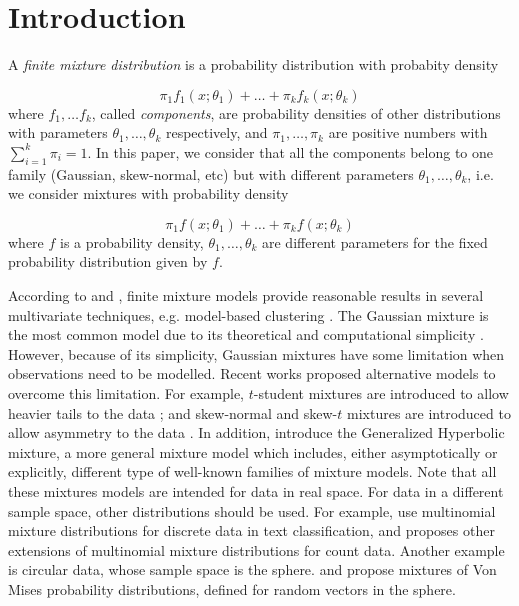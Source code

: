 \documentclass[preprint, review, 3p, authoryear]{elsarticle}
\begin{document}
\section{Introduction}

\noindent  A \emph{finite mixture distribution} is a probability distribution with probabity density

\[
\pi_1 f_1(x ; \theta_1) + \dots + \pi_k f_k(x ; \theta_k)
\]
where $f_1, \dots f_k$, called \emph{components}, are probability densities of other distributions with parameters $\theta_1, \dots, \theta_k$ respectively, and $\pi_1, \dots, \pi_k$ are positive numbers with $\sum_{i=1}^k \pi_i = 1$. In this paper, we consider that all the components belong to one family (Gaussian, skew-normal, etc) but with different parameters $\theta_1, \dots, \theta_k$, i.e. we consider mixtures with probability density

\begin{equation}\label{mixt}
\pi_1 f(x ; \theta_1) + \dots + \pi_k f(x ; \theta_k)
\end{equation}
where $f$ is a probability density, $\theta_1, \dots, \theta_k$ are different parameters for the fixed probability distribution given by $f$.



According to \cite{scott1971clustering} and \cite{mclachlan2004finite}, finite mixture models provide reasonable results in several multivariate techniques, e.g. model-based clustering  \citep{banfield1993model,  fraley2002model}. The Gaussian mixture is the most common model 
due to its theoretical and computational simplicity \citep{mclachlan2004finite}. 
However, because of its simplicity, Gaussian mixtures have some limitation when observations need to be modelled.
%
%
%
Recent works  proposed alternative models to overcome this limitation. For example, $t$-student mixtures are introduced to allow heavier tails to the data \citep{andrews2012model, lee2013finite, lin2010robust}; and skew-normal and skew-$t$ mixtures are introduced to allow asymmetry to the data \citep{lee2011fitting}. In addition, \cite{browne2013mixture} introduce the Generalized Hyperbolic mixture, a more general mixture model which includes, either asymptotically or explicitly, different type of well-known families of mixture models. Note that all these mixtures models are intended for data in real space. For data in a different sample space, other distributions should be used. 
For example, \cite{bickel2004multi} use multinomial mixture distributions for discrete data in text classification, and  
 \cite[][]{bouguila2011count} proposes other extensions of multinomial mixture distributions for count data. 
Another example is circular data, whose sample space is the sphere.  \cite{banerjee2005clustering} and \cite{mardia2007protein} propose mixtures of Von Mises probability distributions, defined for random vectors in the sphere.
\end{document}
